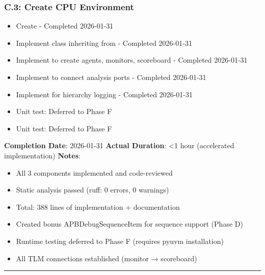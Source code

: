 \subsubsection{C.3: Create CPU Environment}\label{cr:status:pyuvm-migration:c3-create-cpu-environment}

\begin{record}

\begin{itemize}
\tightlist
\item[$\boxtimes$]
  Create  - Completed 2026-01-31
\item[$\boxtimes$]
  Implement  class inheriting from  -
  Completed 2026-01-31
\item[$\boxtimes$]
  Implement  to create agents, monitors, scoreboard
  - Completed 2026-01-31
\item[$\boxtimes$]
  Implement  to connect analysis ports - Completed
  2026-01-31
\item[$\boxtimes$]
  Implement  for hierarchy logging -
  Completed 2026-01-31
\item[$\boxtimes$]
  Unit test: Deferred to Phase F
\item[$\boxtimes$]
  Unit test: Deferred to Phase F
\end{itemize}

\textbf{Completion Date}: 2026-01-31 \textbf{Actual Duration}:
\textless1 hour (accelerated implementation) \textbf{Notes}:

\begin{itemize}
\tightlist
\item
  All 3 components implemented and code-reviewed
\item
  Static analysis passed (ruff: 0 errors, 0 warnings)
\item
  Total: 388 lines of implementation + documentation
\item
  Created bonus APBDebugSequenceItem for sequence support (Phase D)
\item
  Runtime testing deferred to Phase F (requires pyuvm installation)
\item
  All TLM connections established (monitor → scoreboard)
\end{itemize}

\begin{center}\rule{0.5\linewidth}{0.5pt}\end{center}

\end{record}

